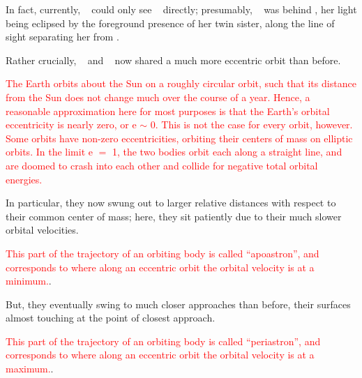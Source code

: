 \documentclass[main.tex]{subfiles}
\begin{document}
\par \nar  In fact, currently, \rmcelaeno~ could only see \rmalcyone~ directly; presumably, \rmtaygete~ was behind \rmalcyone, her light being eclipsed by the foreground presence of her twin sister, along the line of sight separating her from \rmcelaeno.

\par \nar Rather crucially, \rmtaygete~ and \rmalcyone~ now shared a much more eccentric orbit than before.

\begin{tcolorbox}[sharp corners, colback=red!30, colframe=red!80!blue, title=Orbital Eccentricity]
\par \textcolor{red}{The Earth orbits about the Sun on a roughly circular orbit, such that its distance from the Sun does not change much over the course of a year.  Hence, a reasonable approximation here for most purposes is that the Earth's orbital eccentricity is nearly zero, or e $\sim$ 0.  This is not the case for every orbit, however.  Some orbits have non-zero eccentricities, orbiting their centers of mass on elliptic orbits.  In the limit e $=$ 1, the two bodies orbit each along a straight line, and are doomed to crash into each other and collide for negative total orbital energies.}  
\end{tcolorbox}

\par \nar In particular, they now swung out to larger relative distances with respect to their common center of mass; here, they sit patiently due to their much slower orbital velocities. 

\begin{tcolorbox}[sharp corners, colback=red!30, colframe=red!80!blue, title=Apoastron]
\par \textcolor{red} {This part of the trajectory of an orbiting body is called ``apoastron'', and corresponds to where along an eccentric orbit the orbital velocity is at a minimum.}.  
\end{tcolorbox}

\par \nar But, they eventually swing to much closer approaches than before, their surfaces almost touching at the point of closest approach.

\begin{tcolorbox}[sharp corners, colback=red!30, colframe=red!80!blue, title=Periastron]
\par \textcolor{red}{This part of the trajectory of an orbiting body is called ``periastron'', and corresponds to where along an eccentric orbit the orbital velocity is at a maximum.}.  
\end{tcolorbox}
\end{document}
